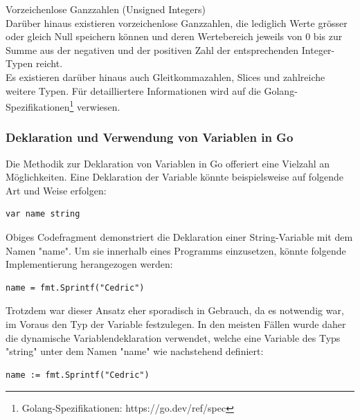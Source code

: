 Vorzeichenlose Ganzzahlen (Unsigned Integers)\\
Darüber hinaus existieren vorzeichenlose Ganzzahlen, die lediglich Werte grösser oder gleich Null speichern können und deren Wertebereich jeweils von 0 bis zur Summe aus der negativen und der positiven Zahl der entsprechenden Integer-Typen reicht.\\
Es existieren darüber hinaus auch Gleitkommazahlen, Slices und zahlreiche weitere Typen. Für detailliertere Informationen wird auf die Golang-Spezifikationen\footnote{Golang-Spezifikationen: https://go.dev/ref/spec} verwiesen.
\subsubsection{Deklaration und Verwendung von Variablen in Go}
Die Methodik zur Deklaration von Variablen in Go offeriert eine Vielzahl an Möglichkeiten. Eine Deklaration der Variable könnte beispielsweise auf folgende Art und Weise erfolgen:
\begin{lstlisting}
var name string
\end{lstlisting}
Obiges Codefragment demonstriert die Deklaration einer String-Variable mit dem Namen "name". Um sie innerhalb eines Programms einzusetzen, könnte folgende Implementierung herangezogen werden:
\begin{lstlisting}
name = fmt.Sprintf("Cedric")
\end{lstlisting}
Trotzdem war dieser Ansatz eher sporadisch in Gebrauch, da es notwendig war, im Voraus den Typ der Variable festzulegen. In den meisten Fällen wurde daher die dynamische Variablendeklaration verwendet, welche eine Variable des Typs "string" unter dem Namen "name" wie nachstehend definiert:
\begin{lstlisting}
name := fmt.Sprintf("Cedric")
\end{lstlisting}
